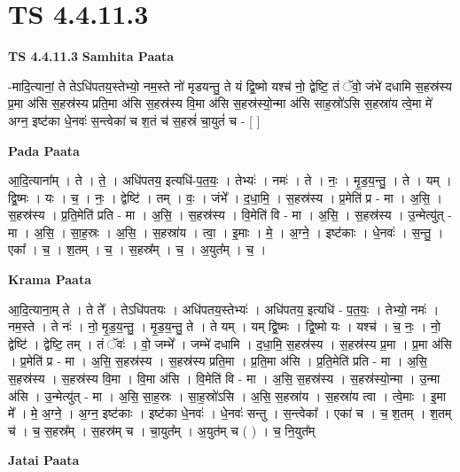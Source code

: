 \documentclass[17pt]{extarticle}
\begin{document}
\section{ TS 4.4.11.3 }

\textbf{TS 4.4.11.3 } \newline
\textbf{Samhita Paata} \newline

-मादि॒त्यानां॒ ते तेऽधि॑पतय॒स्तेभ्यो॒ नम॒स्ते नो॑ मृडयन्तु॒ ते यं द्वि॒ष्मो यश्च॑ नो॒ द्वेष्टि॒ तं ॅवो॒ जंभे॑ दधामि स॒हस्र॑स्य प्र॒मा अ॑सि स॒हस्र॑स्य प्रति॒मा अ॑सि स॒हस्र॑स्य वि॒मा अ॑सि स॒हस्र॑स्यो॒न्मा अ॑सि साह॒स्रो॑ऽसि स॒हस्रा॑य त्वे॒मा मे॑ अग्न॒ इष्ट॑का धे॒नवः॑ स॒न्त्वेका॑ च श॒तं च॑ स॒हस्रं॑ चा॒युतं॑ च - [  ] \newline

\textbf{Pada Paata} \newline

आ॒दि॒त्याना᳚म् । ते । ते॒ । अधि॑पतय॒ इत्यधि॑-प॒त॒यः॒ । तेभ्यः॑ । नमः॑ । ते । नः॒ । मृ॒ड॒य॒न्तु॒ । ते । यम् । द्वि॒ष्मः । यः । च॒ । नः॒ । द्वेष्टि॑ । तम् । वः॒ । जंभे᳚ । द॒धा॒मि॒ । स॒हस्र॑स्य । प्र॒मेति॑ प्र - मा । अ॒सि॒ । स॒हस्र॑स्य । प्र॒ति॒मेति॑ प्रति - मा । अ॒सि॒ । स॒हस्र॑स्य । वि॒मेति॑ वि - मा । अ॒सि॒ । स॒हस्र॑स्य । उ॒न्मेत्यु॑त् - मा । अ॒सि॒ । सा॒ह॒स्रः । अ॒सि॒ । स॒हस्रा॑य । त्वा॒ । इ॒माः । मे॒ । अ॒ग्ने॒ । इष्ट॑काः । धे॒नवः॑ । स॒न्तु॒ । एका᳚ । च॒ । श॒तम् । च॒ । स॒हस्र᳚म् । च॒ । अ॒युत᳚म् । च॒ ।  \newline


\textbf{Krama Paata} \newline

आ॒दि॒त्याना॒म् ते । ते ते᳚ । तेऽधि॑पतयः । अधि॑पतय॒स्तेभ्यः॑ । अधि॑पतय॒ इत्यधि॑ - प॒त॒यः॒ । तेभ्यो॒ नमः॑ । नम॒स्ते । ते नः॑ । नो॒ मृ॒ड॒य॒न्तु॒ । मृ॒ड॒य॒न्तु॒ ते । ते यम् । यम् द्वि॒ष्मः । द्वि॒ष्मो यः । यश्च॑ । च॒ नः॒ । नो॒ द्वेष्टि॑ । द्वेष्टि॒ तम् । तं ॅवः॑ । वो॒ जम्भे᳚ । जम्भे॑ दधामि । द॒धा॒मि॒ स॒हस्र॑स्य । स॒हस्र॑स्य प्र॒मा । प्र॒मा अ॑सि । प्र॒मेति॑ प्र - मा । अ॒सि॒ स॒हस्र॑स्य । स॒हस्र॑स्य प्रति॒मा । प्र॒ति॒मा अ॑सि । प्र॒ति॒मेति॑ प्रति - मा । अ॒सि॒ स॒हस्र॑स्य । स॒हस्र॑स्य वि॒मा । वि॒मा अ॑सि । वि॒मेति॑ वि - मा । अ॒सि॒ स॒हस्र॑स्य । स॒हस्र॑स्यो॒न्मा । उ॒न्मा अ॑सि । उ॒न्मेत्यु॑त् - मा । अ॒सि॒ सा॒ह॒स्रः । सा॒ह॒स्रो॑ऽसि । अ॒सि॒ स॒हस्रा॑य । स॒हस्रा॑य त्वा । त्वे॒माः । इ॒मा मे᳚ । मे॒ अ॒ग्ने॒ । अ॒ग्न॒ इष्ट॑काः । इष्ट॑का धे॒नवः॑ । धे॒नवः॑ सन्तु । स॒न्त्वेका᳚ । एका॑ च । च॒ श॒तम् । श॒तम् च॑ । च॒ स॒हस्र᳚म् । स॒हस्र॑म् च । चा॒युत᳚म् । अ॒युत॑म् च ( ) । च॒ नि॒युत᳚म् \newline

\textbf{Jatai Paata} \newline
\end{document}
